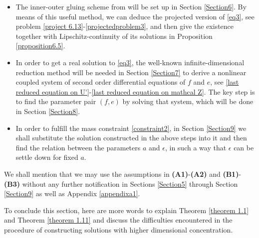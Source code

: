 \documentclass[10pt, reqno]{amsart}
\numberwithin{equation}{section}
\theoremstyle{definition}
\begin{document}
{\begin{itemize}
\smallskip
 \item[(2).]
The inner-outer gluing scheme from \cite{delPKowWei1} will be set up in Section \ref{Section6}.
By means of this useful method, we can deduce the projected version of \eqref{eq3}, see problem \eqref{project 6.13}-\eqref{projectedproblem3}, and then give the existence together with Lipschitz-continuity of its solutions in Proposition \ref{proposition6.5}.

\smallskip
\item[(3).]
In order to get a real solution to \eqref{eq3}, the well-known infinite-dimensional reduction method will be needed in Section \ref{Section7} to derive a nonlinear coupled system of second order differential equations of $f$ and $e$, see \eqref{last reduced equation on U'}-\eqref{last reduced equation on mathcal Z}.
The key step is to find the parameter pair $(f, e)$ by solving that system, which will be done in Section \ref{Section8}.


\smallskip
\item[(4).]
In order to fulfill the mass constraint \eqref{constraint2}, in Section \ref{Section9} we shall substitute the solution constructed in the above steps into it and then find the relation between the parameters $a$ and $\epsilon$, in such a way that $\epsilon$ can be settle down for fixed $a$.
\end{itemize}
We shall mention that we may use the assumptions in {\bf{(A1)}}-{\bf{(A2)}} and {\bf{(B1)}}-{\bf{(B3)}}
without any further notification in Sections \ref{Section5} through Section \ref{Section9} as well as Appendix \ref{appendixa1}.





\medskip
To conclude this section, here are more words to explain Theorem \ref{theorem 1.1} and Theorem \ref{theorem 1.11} and discuss the difficulties encountered in the procedure of constructing solutions with higher dimensional concentration.

}
\end{document}
